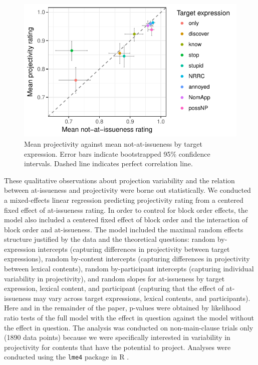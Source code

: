 \documentclass[11pt,fleqn]{article}
\newcommand{\6}{\mbox{$[\hspace*{-.6mm}[$}}
\newcommand{\9}{\mbox{$]\hspace*{-.6mm}]$}}
\begin{document}
\begin{figure}[!h]

\begin{center}
\includegraphics[width=12cm]{../results/exp1a/graphs/ai-proj-bytrigger}
\end{center}

\caption{Mean projectivity against mean not-at-issueness by target expression. Error bars indicate bootstrapped 95\% confidence intervals. Dashed line indicates perfect correlation line.}
\label{fig:f-proj-ai-1a}
\end{figure}

These qualitative observations about projection variability and the relation between at-issueness and projectivity were borne out statistically. We conducted a mixed-effects linear regression predicting projectivity rating from a centered fixed effect of at-issueness rating. In order to control for block order effects, the model also included a centered fixed effect of block order and the interaction of block order and at-issueness. The model included the maximal random effects structure justified by the data and the theoretical questions: random by-expression intercepts (capturing differences in projectivity between target expressions),  random by-content intercepts (capturing differences in projectivity between lexical contents), random by-participant intercepts (capturing individual variability in projectivity), and random slopes for at-issueness by target expression, lexical content, and participant (capturing that the effect of at-issueness may vary across target expressions, lexical contents, and participants). Here and in the remainder of the paper, p-values were obtained by likelihood ratio tests of the full model with the effect in question against the model without the effect in question. The analysis was conducted on non-main-clause trials only (1890 data points) because we were specifically interested in variability in projectivity for contents that have the potential to project. Analyses were conducted using the \verb|lme4| package \citep{bates2015} in R \citep{r}.
\end{document}
